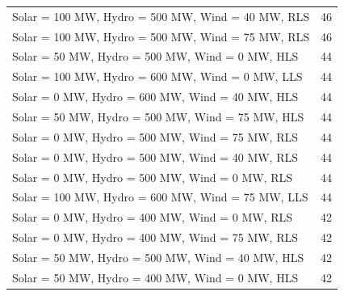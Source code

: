 \documentclass[10pt]{report}
\begin{document}
\begin{table}[H]
{\begin{tabular}{lr}
Solar = 100 MW, Hydro = 500 MW, Wind = 40 MW, RLS & 46 \\
Solar = 100 MW, Hydro = 500 MW, Wind = 75 MW, RLS & 46 \\
Solar = 50 MW, Hydro = 500 MW, Wind = 0 MW, HLS & 44 \\
Solar = 100 MW, Hydro = 600 MW, Wind = 0 MW, LLS & 44 \\
Solar = 0 MW, Hydro = 600 MW, Wind = 40 MW, HLS & 44 \\
Solar = 50 MW, Hydro = 500 MW, Wind = 75 MW, HLS & 44 \\
Solar = 0 MW, Hydro = 500 MW, Wind = 75 MW, RLS & 44 \\
Solar = 0 MW, Hydro = 500 MW, Wind = 40 MW, RLS & 44 \\
Solar = 0 MW, Hydro = 500 MW, Wind = 0 MW, RLS & 44 \\
Solar = 100 MW, Hydro = 600 MW, Wind = 75 MW, LLS & 44 \\
Solar = 0 MW, Hydro = 400 MW, Wind = 0 MW, RLS & 42 \\
Solar = 0 MW, Hydro = 400 MW, Wind = 75 MW, RLS & 42 \\
Solar = 50 MW, Hydro = 500 MW, Wind = 40 MW, HLS & 42 \\
Solar = 50 MW, Hydro = 400 MW, Wind = 0 MW, HLS & 42 \\
\bottomrule
\end{tabular}}
\end{table}
\end{document}
